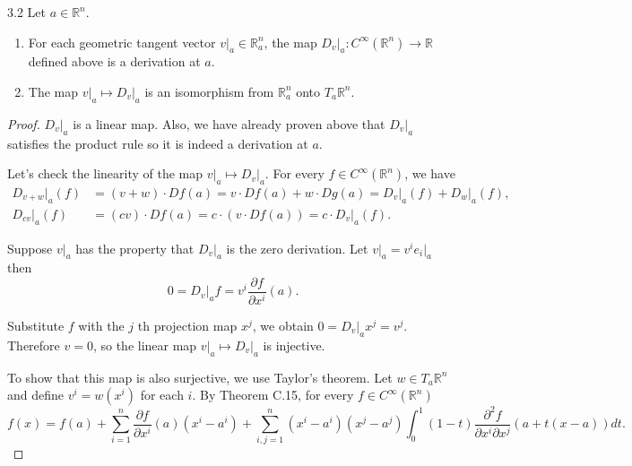 \begin{prop}{3.2}
    Let \( a \in \mathbb{R}^{n} \).
    \begin{enumerate}[label={(\alph*)},itemsep=0pt,topsep=0pt]
        \item For each geometric tangent vector \( v\vert_{a} \in \mathbb{R}_{a}^{n} \), the map \( D_{v}\vert_{a}: C^{\infty}(\mathbb{R}^{n}) \to \mathbb{R} \) defined above is a derivation at \( a \).
        \item The map \( v\vert_{a} \mapsto D_{v}\vert_{a} \) is an isomorphism from \( \mathbb{R}_{a}^{n} \) onto \( T_{a}\mathbb{R}^{n} \).
    \end{enumerate}
\end{prop}

\begin{proof}
    \( D_{v}\vert_{a} \) is a linear map. Also, we have already proven above that \( D_{v}\vert_{a} \) satisfies the product rule so it is indeed a derivation at \( a \).

    Let's check the linearity of the map \( v\vert_{a} \mapsto D_{v}\vert_{a} \). For every \( f \in C^{\infty}(\mathbb{R}^{n}) \), we have
    \begingroup
    \allowdisplaybreaks%
    \begin{align*}
        D_{v + w}\vert_{a}(f) & = (v + w)\cdot Df(a) = v\cdot Df(a) + w\cdot Dg(a) = D_{v}\vert_{a}(f) + D_{w}\vert_{a}(f), \\
        D_{cv}\vert_{a}(f)    & = (cv)\cdot Df(a) = c\cdot (v\cdot Df(a)) = c\cdot D_{v}\vert_{a}(f).
    \end{align*}
    \endgroup

    Suppose \( v\vert_{a} \) has the property that \( D_{v}\vert_{a} \) is the zero derivation. Let \( v\vert_{a} = v^{i}e_{i}\vert_{a} \) then
    \[
        0 = D_{v}\vert_{a}f = v^{i}\dfrac{\partial f}{\partial x^{i}}(a).
    \]

    Substitute \( f \) with the \(j\) th projection map \( x^{j} \), we obtain \( 0 = D_{v}\vert_{a}x^{j} = v^{j} \). Therefore \( v = 0 \), so the linear map \( v\vert_{a} \mapsto D_{v}\vert_{a} \) is injective.

    To show that this map is also surjective, we use Taylor's theorem. Let \( w \in T_{a}\mathbb{R}^{n} \) and define \( v^{i} = w(x^{i}) \) for each \( i \). By Theorem C.15, for every \( f \in C^{\infty}(\mathbb{R}^{n}) \)
    \[
        f(x) = f(a) + \sum_{i=1}^{n}\dfrac{\partial f}{\partial x^{i}}(a) (x^{i} - a^{i}) + \sum_{i,j=1}^{n}(x^{i} - a^{i})(x^{j} - a^{j}) \int_{0}^{1}(1 - t)\dfrac{\partial^{2}f}{\partial x^{i}\partial x^{j}}(a + t(x - a)) dt.
    \]


\end{proof}
